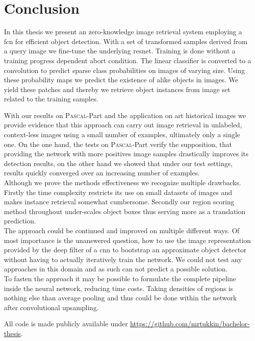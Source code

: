 %
\chapter{Conclusion}
\label{sec:conclusion}
In this thesis we present an zero-knowledge image retrieval system employing a \acrlong{fcn} for efficient object detection. With a set of transformed samples derived from a query image we fine-tune the underlying \gls{resnet}. Training is done without a training progress dependent abort condition. The linear classifier is converted to a convolution to predict sparse class probabilities on images of varying size. Using these probability maps we predict the existence of alike objects in images. We yield these patches and thereby we retrieve object instances from image set related to the training samples.

With our results on \textsc{Pascal}-Part and the application on art historical images we provide evidence that this approach can carry out image retrieval in unlabeled, context-less images using a small number of examples, ultimately only a single one. On the one hand, the tests on \textsc{Pascal}-Part verify the supposition, that providing the network with more positives image samples drastically improves its detection results, on the other hand we showed that under our test settings, results quickly converged over an increasing number of examples.\\
Although we prove the methods effectiveness we recognize multiple drawbacks. Firstly the time complexity  restricts its use on small datasets of images and makes instance retrieval somewhat cumbersome. Secondly our region scoring method throughout under-scales object boxes thus serving more as a translation prediction.\\
The approach could be continued and improved on multiple different ways. Of most importance is the unanswered question, how to use the image representation provided by the deep filter of a \gls{cnn} to bootstrap an approximate object detector without having to actually iteratively train the network. We could not test any approaches in this domain and as such can not predict a possible solution.\\
To fasten the approach it may be possible to formulate the complete pipeline inside the neural network, reducing time costs. Taking densities of regions is nothing else than average pooling and thus could be done within the network after convolutional upsampling.

All code is made publicly available under \url{https://github.com/mrtukkin/bachelor-thesis}.
